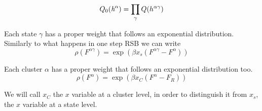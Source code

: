 \begin{equation}
Q_0({\emph{h}^\alpha})=\prod_\gamma Q(h^{\alpha\gamma})
\end{equation}

Each state $\gamma$ has a proper weight that follows an exponential distribution. Similarly to what happens in one step RSB we can write
\begin{equation}
\rho(F^{\alpha\gamma}) = \exp(\beta x_s (F^{\alpha\gamma}-{F}^{\alpha}))
\label{distro2}
\end{equation}

Each cluster $\alpha$ has a proper weight that follows an exponential distribution too.
\begin{equation}
\rho(F^\alpha) = \exp(\beta x_C (F^\alpha-{F_R}))
\label{distro1}
\end{equation}

We will call $x_C$ the $x$ variable at a cluster level, in order to distinguish it from $x_s$, the $x$ variable at a state level. 